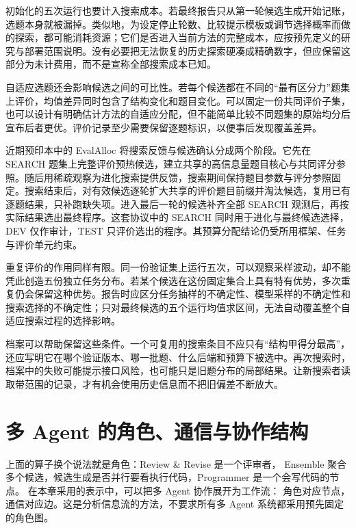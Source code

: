 初始化的五次运行也要计入搜索成本。若最终报告只从第一轮候选生成开始记账，选题本身就被漏掉。类似地，为设定停止轮数、比较提示模板或调节选择概率而做的探索，都可能消耗资源；它们是否进入当前方法的完整成本，应按预先定义的研究与部署范围说明。没有必要把无法恢复的历史探索硬凑成精确数字，但应保留这部分为未计费用，而不是宣称全部搜索成本已知。

自适应选题还会影响候选之间的可比性。若每个候选都在不同的“最有区分力”题集上评价，均值差异同时包含了结构变化和题目变化。可以固定一份共同评价子集，也可以设计有明确估计方法的自适应分配，但不能简单比较不同题集的原始均分后宣布后者更优。评价记录至少需要保留逐题标识，以便事后发现覆盖差异。

近期预印本中的 EvalAlloc 将搜索反馈与候选确认分成两个阶段\cite{evalalloc-2610}。它先在 SEARCH 题集上完整评价预热候选，建立共享的高信息量题目核心与共同评分参照。随后用稀疏观察为进化搜索提供反馈，搜索期间保持题目参数与评分参照固定。搜索结束后，对有效候选逐轮扩大共享的评价题目前缀并淘汰候选，复用已有逐题结果，只补跑缺失项。进入最后一轮的候选补齐全部 SEARCH 观测后，再按实际结果选出最终程序。这套协议中的 SEARCH 同时用于进化与最终候选选择，DEV 仅作审计，TEST 只评价选出的程序。其预算分配结论仍受所用框架、任务与评价单元约束。

重复评价的作用同样有限。同一份验证集上运行五次，可以观察采样波动，却不能凭此创造五份独立任务分布。若某个候选在这份固定集合上具有特有优势，多次重复仍会保留这种优势。报告时应区分任务抽样的不确定性、模型采样的不确定性和搜索选择的不确定性；只对最终候选的五个运行均值求区间，无法自动覆盖整个自适应搜索过程的选择影响。

档案可以帮助保留这些条件。一个可复用的搜索条目不应只有“结构甲得分最高”，还应写明它在哪个验证版本、哪一批题、什么后端和预算下被选中。再次搜索时，档案中的失败可能提示接口风险，也可能只是旧题分布的局部结果。让新搜索者读取带范围的记录，才有机会使用历史信息而不把旧偏差不断放大。

\section{多 Agent 的角色、通信与协作结构}
\label{sec:ch09-multi}

上面的算子换个说法就是角色：Review \& Revise 是一个评审者，
Ensemble 聚合多个候选，候选生成是否并行要看执行代码，Programmer 是一个会写代码的节点。
在本章采用的表示中，可以把多 Agent 协作展开为工作流：
角色对应节点，通信对应边。这是分析信息流的方法，不要求所有多 Agent 系统都采用预先固定的角色图。

